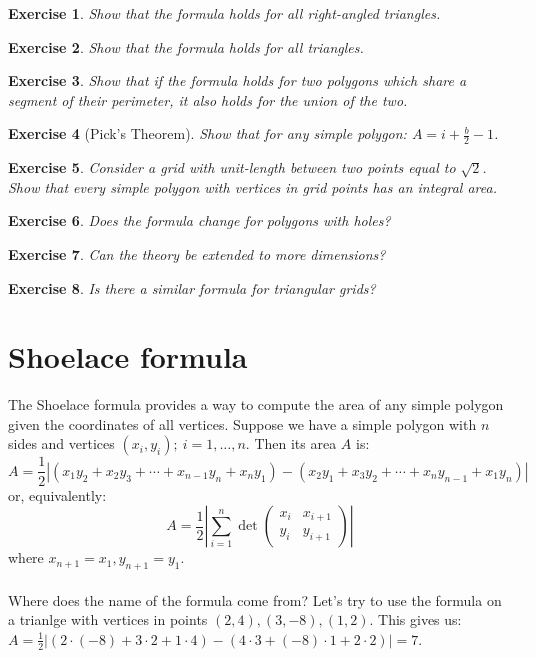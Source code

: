 \documentclass{article}
\newtheorem{exercise}{Exercise}
\begin{document}
\begin{exercise}
	Show that the formula holds for all right-angled triangles.
\end{exercise}

\begin{exercise}
	Show that the formula holds for all triangles.
\end{exercise}

\begin{exercise}
	Show that if the formula holds for two polygons which share a segment of their perimeter, it also holds for the union of the two.
\end{exercise}

\begin{exercise}[Pick's Theorem]
	Show that for any simple polygon:  $A = i + \frac{b}{2} - 1$.
\end{exercise}

\begin{exercise}
	Consider a grid with unit-length between two points equal to $\sqrt{2}$. Show that every simple polygon with vertices in grid points has an integral area.
\end{exercise}

\begin{exercise}
	Does the formula change for polygons with holes?
\end{exercise}

\begin{exercise}
	Can the theory be extended to more dimensions?
\end{exercise}

\begin{exercise}
    Is there a similar formula for triangular grids?
\end{exercise}

\section*{Shoelace formula}
The Shoelace formula provides a way to compute the area of any simple polygon given the coordinates of all vertices. Suppose we have a simple polygon with $n$ sides and vertices $(x_i, y_i); \ i = 1, \dots, n$. Then its area $A$ is: \[A = \frac{1}{2} |(x_1 y_2 + x_2 y_3 + \cdots + x_{n-1} y_n + x_n y_1)  - (x_2 y_1 + x_3 y_2 + \cdots + x_n y_{n-1} + x_1 y_n)|\]
or, equivalently:
\[A = \frac{1}{2}|\sum_{i=1}^n \det{\left( \begin{smallmatrix} x_i&x_{i+1}\\ y_i&y_{i+1} \end{smallmatrix} \right)}|\]
where $x_{n+1} = x_1, y_{n+1} = y_1$. \\\\
Where does the name of the formula come from? Let's try to use the formula on a trianlge with vertices in points $(2, 4), (3, -8), (1, 2)$. This gives us: $A = \frac{1}{2} | (2 \cdot (-8) + 3 \cdot 2 + 1 \cdot 4) - (4 \cdot 3 + (-8) \cdot 1 + 2 \cdot 2) | = 7$.
\end{document}
